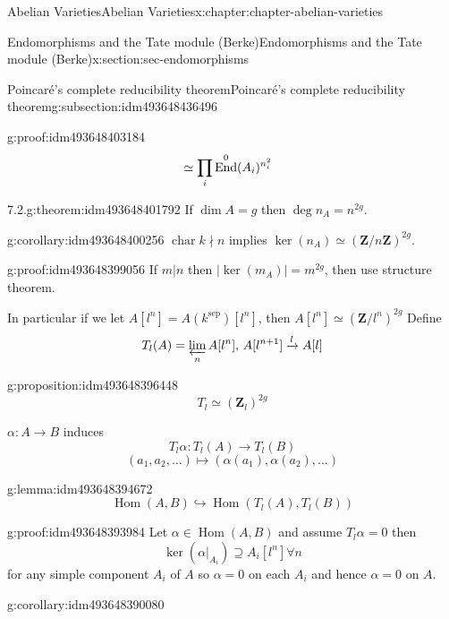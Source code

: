 \documentclass[oneside,10pt,]{book}
\newcommand{\qedhere}{\relax}
\numberwithin{equation}{section}
\newcommand{\lb}{[}
\newcommand{\rb}{]}
\newcommand{\ZZ}{\mathbf{Z}}
\newcommand{\sep}{\mathrm{sep}}
\DeclareMathOperator{\End}{End}
\DeclareMathOperator{\Hom}{Hom}
\DeclareMathOperator{\characteristic}{char}
\newcommand{\amp}{&}
\begin{document}
\begin{chapterptx}{Abelian Varieties}{}{Abelian Varieties}{}{}{x:chapter:chapter-abelian-varieties}
\begin{sectionptx}{Endomorphisms and the Tate module (Berke)}{}{Endomorphisms and the Tate module (Berke)}{}{}{x:section:sec-endomorphisms}
\begin{subsectionptx}{Poincaré's complete reducibility theorem}{}{Poincaré's complete reducibility theorem}{}{}{g:subsection:idm493648436496}
\begin{proofptx}{}{g:proof:idm493648403184}
\begin{align*}
\amp \simeq \prod_{i} \End^0(A_i)^{n_i^2}\qedhere
\end{align*}
%
\end{proofptx}
\begin{theorem}{7.2.}{}{g:theorem:idm493648401792}%
If \(\dim A = g\) then \(\deg n_A  =n^{2g}\).%
\end{theorem}
\begin{corollary}{}{}{g:corollary:idm493648400256}%
\(\characteristic k \nmid n\) implies \(\ker(n_A) \simeq (\ZZ/n\ZZ)^{2g}\).%
\end{corollary}
\begin{proofptx}{}{g:proof:idm493648399056}
If  \(m | n\) then \(|\ker (m_A)| = m^{2g}\), then use structure theorem.%
\end{proofptx}
In particular if we let \(A\lb l^n\rb = A(k^\sep) \lb l^n\rb\), then \(A\lb l^n\rb \simeq (\ZZ/l^n)^{2g}\) Define%
\begin{equation*}
T_l(A) = \varprojlim_n A[l^n],\, A[l^{n+1}] \xrightarrow{l} A[l]
\end{equation*}
%
\begin{proposition}{}{}{g:proposition:idm493648396448}%
%
\begin{equation*}
T_l \simeq (\ZZ_l)^{2g}
\end{equation*}
%
\end{proposition}
\(\alpha \colon A \to B\) induces%
\begin{equation*}
T_l\alpha\colon T_l(A) \to T_l(B)
\end{equation*}
%
\begin{equation*}
(a_1,a_2, \ldots) \mapsto(\alpha(a_1),\alpha(a_2), \ldots)
\end{equation*}
%
\begin{lemma}{}{}{g:lemma:idm493648394672}%
%
\begin{equation*}
\Hom(A,B) \hookrightarrow \Hom(T_l(A), T_l(B))
\end{equation*}
%
\end{lemma}
\begin{proofptx}{}{g:proof:idm493648393984}
Let \(\alpha \in \Hom(A,B)\) and assume \(T_l \alpha = 0\) then%
\begin{equation*}
\ker (\alpha|_{A_i}) \supseteq A_i[l^n] \forall n
\end{equation*}
for any simple component \(A_i\) of \(A\) so \(\alpha =0\) on each \(A_i\) and hence \(\alpha = 0\) on \(A\).%
\end{proofptx}
\begin{corollary}{}{}{g:corollary:idm493648390080}%

\end{corollary}
\end{subsectionptx}
\end{sectionptx}
\end{chapterptx}
\end{document}
